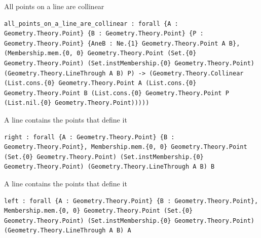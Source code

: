 \begin{theorem}
  \label{Geometry.Theory.Line.all_points_on_a_line_are_collinear}
  \leanok
  All points on a line are collinear 
\begin{verbatim}all_points_on_a_line_are_collinear : forall {A : Geometry.Theory.Point} {B : Geometry.Theory.Point} {P : Geometry.Theory.Point} {AneB : Ne.{1} Geometry.Theory.Point A B}, (Membership.mem.{0, 0} Geometry.Theory.Point (Set.{0} Geometry.Theory.Point) (Set.instMembership.{0} Geometry.Theory.Point) (Geometry.Theory.LineThrough A B) P) -> (Geometry.Theory.Collinear (List.cons.{0} Geometry.Theory.Point A (List.cons.{0} Geometry.Theory.Point B (List.cons.{0} Geometry.Theory.Point P (List.nil.{0} Geometry.Theory.Point)))))\end{verbatim}
\end{theorem}


\begin{theorem}
  \label{Geometry.Theory.Line.line_has_definition_points.right}
  \leanok
  A line contains the points that define it 
\begin{verbatim}right : forall {A : Geometry.Theory.Point} {B : Geometry.Theory.Point}, Membership.mem.{0, 0} Geometry.Theory.Point (Set.{0} Geometry.Theory.Point) (Set.instMembership.{0} Geometry.Theory.Point) (Geometry.Theory.LineThrough A B) B\end{verbatim}
\end{theorem}

\begin{theorem}
  \label{Geometry.Theory.Line.line_has_definition_points.left}
  \leanok
  A line contains the points that define it 
\begin{verbatim}left : forall {A : Geometry.Theory.Point} {B : Geometry.Theory.Point}, Membership.mem.{0, 0} Geometry.Theory.Point (Set.{0} Geometry.Theory.Point) (Set.instMembership.{0} Geometry.Theory.Point) (Geometry.Theory.LineThrough A B) A\end{verbatim}
\end{theorem}

